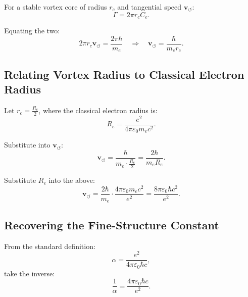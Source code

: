 \documentclass[preprint]{revtex4-2}
\begin{document}
For a stable vortex core of radius \( r_c \) and tangential speed \( \mathbf{v}_{\scriptscriptstyle\boldsymbol{\circlearrowleft}} \):
\begin{equation}
    \Gamma = 2\pi r_c C_e.
\end{equation}

Equating the two:
\begin{equation}
    2\pi r_c \mathbf{v}_{\scriptscriptstyle\boldsymbol{\circlearrowleft}} = \frac{2\pi \hbar}{m_e} \quad \Rightarrow \quad \mathbf{v}_{\scriptscriptstyle\boldsymbol{\circlearrowleft}} = \frac{\hbar}{m_e r_c}.
\end{equation}

\subsection{Relating Vortex Radius to Classical Electron Radius}

Let \( r_c = \frac{R_e}{2} \), where the classical electron radius is:
\begin{equation}
    R_e = \frac{e^2}{4\pi \varepsilon_0 m_e c^2}.
\end{equation}

Substitute into \( \mathbf{v}_{\scriptscriptstyle\boldsymbol{\circlearrowleft}} \):
\begin{equation}
    \mathbf{v}_{\scriptscriptstyle\boldsymbol{\circlearrowleft}} = \frac{\hbar}{m_e \cdot \frac{R_e}{2}} = \frac{2\hbar}{m_e R_e}.
\end{equation}

Substitute \( R_e \) into the above:
\begin{equation}
    \mathbf{v}_{\scriptscriptstyle\boldsymbol{\circlearrowleft}} = \frac{2\hbar}{m_e} \cdot \frac{4\pi \varepsilon_0 m_e c^2}{e^2} = \frac{8\pi \varepsilon_0 \hbar c^2}{e^2}.
\end{equation}

\subsection{Recovering the Fine-Structure Constant}

From the standard definition:
\begin{equation}
    \alpha = \frac{e^2}{4\pi \varepsilon_0 \hbar c},
\end{equation}
take the inverse:
\begin{equation}
    \frac{1}{\alpha} = \frac{4\pi \varepsilon_0 \hbar c}{e^2}.
\end{equation}
\end{document}
